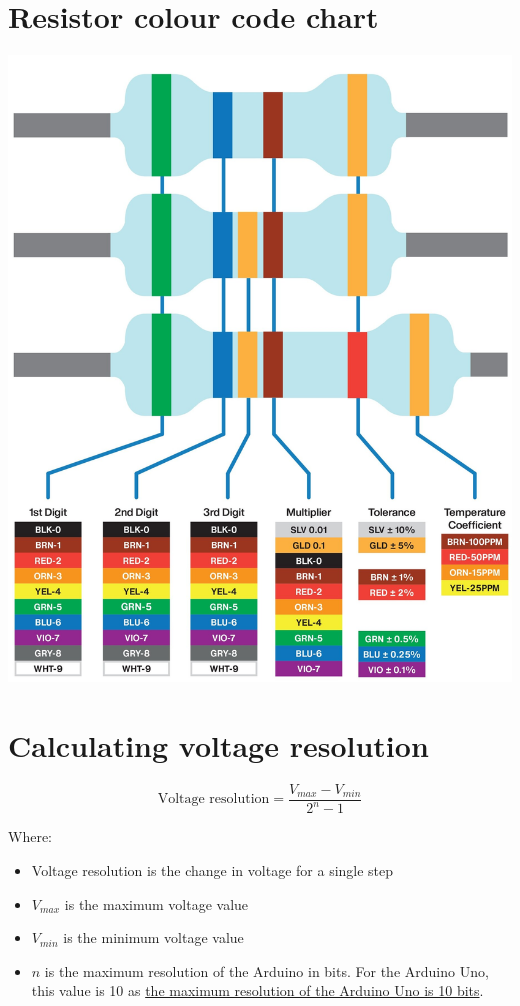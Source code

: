 \documentclass[11pt]{article}
\begin{document}
\section{Resistor colour code chart}
\label{sec:org2616fe4}
\begin{center}
\includegraphics[width=.9\linewidth]{./images/resistor-colour-code-chart.jpg}
\end{center}

 \newpage
\section{Calculating voltage resolution}
\label{sec:org8cc6961}
\[\text{Voltage resolution} = \frac{V_{max} - V_{min}}{2^n - 1}\]

Where:
\begin{itemize}
\item Voltage resolution is the change in voltage for a single step
\item \(V_{max}\) is the maximum voltage value
\item \(V_{min}\) is the minimum voltage value
\item \(n\) is the maximum resolution of the Arduino in bits. For the Arduino Uno, this value is 10 as \href{https://www.arduino.cc/reference/en/language/functions/analog-io/analogread/}{the maximum resolution of the Arduino Uno is 10 bits}.
\end{itemize}
\end{document}
